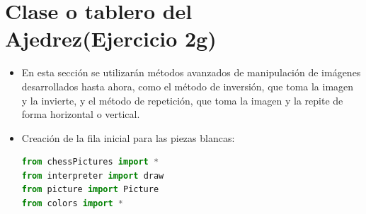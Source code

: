 \documentclass{article}
\begin{document}
	\section{Clase o tablero del Ajedrez(Ejercicio 2g)}
    \begin{itemize}
        \item En esta sección se utilizarán métodos avanzados de manipulación de imágenes desarrollados hasta ahora, como el método de inversión, que toma la imagen y la invierte, y el método de repetición, que toma la imagen y la repite de forma horizontal o vertical.
        \item Creación de la fila inicial para las piezas blancas:
         \begin{lstlisting}[language=Python, caption={Fila inicial para piezas blancas}, float=H]
from chessPictures import *
from interpreter import draw
from picture import Picture
from colors import *


\end{lstlisting}
\end{itemize}
\end{document}
